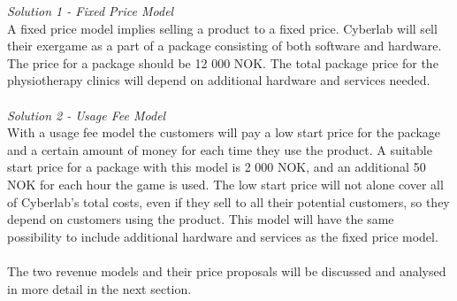 \emph{Solution 1 - Fixed Price Model}\\  
A fixed price model implies selling a product to a fixed price. Cyberlab will sell their exergame as a part of a package consisting of both software and hardware. The price for a package should be 12 000 NOK. The total package price for the physiotherapy clinics will depend on additional hardware and services needed. \\ \\
\emph{Solution 2 - Usage Fee Model}\\
With a usage fee model the customers will pay a low start price for the package and a certain amount of money for each time they use the product. A suitable start price for a package with this model is 2 000 NOK, and an additional 50 NOK for each hour the game is used. The low start price will not alone cover all of Cyberlab's total costs, even if they sell to all their potential customers, so they depend on customers using the product. This model will have the same possibility to include additional hardware and services as the fixed price model. \\ \\
The two revenue models and their price proposals will be discussed and analysed in more detail in the next section.


